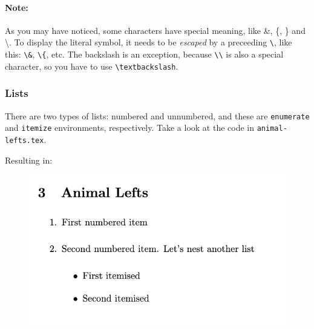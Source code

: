 \paragraph{Note:} As you may have noticed, some characters have special meaning, like \&, \{, \} and \textbackslash. To display the literal symbol, it needs to be \emph{escaped} by a preceeding \verb|\|, like this: \verb|\&|, \verb|\{|, etc. The backslash is an exception, because \verb|\\| is also a special character, so you have to use \verb|\textbackslash|.

\subsubsection{Lists}
There are two types of lists: numbered and unnumbered, and these are \verb|enumerate| and \verb|itemize| environments, respectively.
Take a look at the code in \verb|animal-lefts.tex|.



Resulting in:

\begin{figure}[h]
    \centering
        \includegraphics[scale=0.8]{figures/list.png}
    \label{fig:list}
\end{figure}

